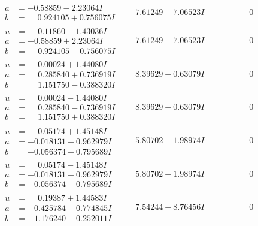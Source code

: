 \documentclass[1p]{elsarticle_modified}
\theoremstyle{definition}
\begin{document}
$$\begin{array}{c|c|c}
\begin{aligned}
a &= -0.58859 - 2.23064 I \\
b &= \phantom{-}0.924105 + 0.756075 I\end{aligned}
 & \phantom{-}7.61249 - 7.06523 I & \phantom{-0.000000 } 0 \\ \hline\begin{aligned}
u &= \phantom{-}0.11860 - 1.43036 I \\
a &= -0.58859 + 2.23064 I \\
b &= \phantom{-}0.924105 - 0.756075 I\end{aligned}
 & \phantom{-}7.61249 + 7.06523 I & \phantom{-0.000000 } 0 \\ \hline\begin{aligned}
u &= \phantom{-}0.00024 + 1.44080 I \\
a &= \phantom{-}0.285840 + 0.736919 I \\
b &= \phantom{-}1.151750 - 0.388320 I\end{aligned}
 & \phantom{-}8.39629 - 0.63079 I & \phantom{-0.000000 } 0 \\ \hline\begin{aligned}
u &= \phantom{-}0.00024 - 1.44080 I \\
a &= \phantom{-}0.285840 - 0.736919 I \\
b &= \phantom{-}1.151750 + 0.388320 I\end{aligned}
 & \phantom{-}8.39629 + 0.63079 I & \phantom{-0.000000 } 0 \\ \hline\begin{aligned}
u &= \phantom{-}0.05174 + 1.45148 I \\
a &= -0.018131 + 0.962979 I \\
b &= -0.056374 - 0.795689 I\end{aligned}
 & \phantom{-}5.80702 - 1.98974 I & \phantom{-0.000000 } 0 \\ \hline\begin{aligned}
u &= \phantom{-}0.05174 - 1.45148 I \\
a &= -0.018131 - 0.962979 I \\
b &= -0.056374 + 0.795689 I\end{aligned}
 & \phantom{-}5.80702 + 1.98974 I & \phantom{-0.000000 } 0 \\ \hline\begin{aligned}
u &= \phantom{-}0.19387 + 1.44583 I \\
a &= -0.425784 + 0.774845 I \\
b &= -1.176240 - 0.252011 I\end{aligned}
 & \phantom{-}7.54244 - 8.76456 I & \phantom{-0.000000 } 0\\

\end{array}$$
\end{document}
